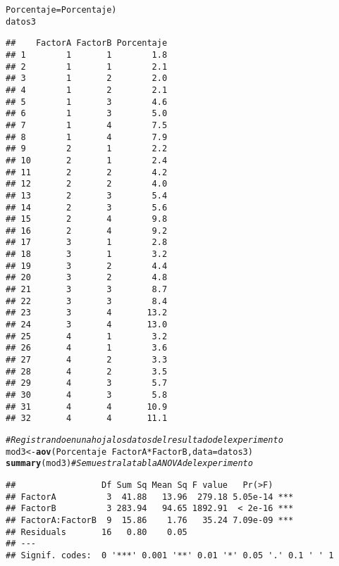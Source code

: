 \documentclass{article}\usepackage[]{graphicx}\usepackage[]{color}
\makeatletter
\newcommand{\hlcom}[1]{\textcolor[rgb]{0.678,0.584,0.686}{\textit{#1}}}%
\newcommand{\hlopt}[1]{\textcolor[rgb]{0,0,0}{#1}}%
\newcommand{\hlstd}[1]{\textcolor[rgb]{0.345,0.345,0.345}{#1}}%
\newcommand{\hlkwb}[1]{\textcolor[rgb]{0.69,0.353,0.396}{#1}}%
\newcommand{\hlkwc}[1]{\textcolor[rgb]{0.333,0.667,0.333}{#1}}%
\newcommand{\hlkwd}[1]{\textcolor[rgb]{0.737,0.353,0.396}{\textbf{#1}}}%
\newenvironment{kframe}{%
 \def\at@end@of@kframe{}%
 \ifinner\ifhmode%
  \def\at@end@of@kframe{\end{minipage}}%
  \begin{minipage}{\columnwidth}%
 \fi\fi%
 \def\FrameCommand##1{\hskip\@totalleftmargin \hskip-\fboxsep
 \colorbox{shadecolor}{##1}\hskip-\fboxsep
     \hskip-\linewidth \hskip-\@totalleftmargin \hskip\columnwidth}%
 \MakeFramed {\advance\hsize-\width
   \@totalleftmargin\z@ \linewidth\hsize
   \@setminipage}}%
 {\par\unskip\endMakeFramed%
 \at@end@of@kframe}
\newenvironment{knitrout}{}{} %
\makeatother
\begin{document}
\begin{knitrout}
\begin{kframe}
\begin{alltt}
                   \hlkwc{Porcentaje}\hlstd{=Porcentaje)}
\hlstd{datos3}
\end{alltt}
\begin{verbatim}
##    FactorA FactorB Porcentaje
## 1        1       1        1.8
## 2        1       1        2.1
## 3        1       2        2.0
## 4        1       2        2.1
## 5        1       3        4.6
## 6        1       3        5.0
## 7        1       4        7.5
## 8        1       4        7.9
## 9        2       1        2.2
## 10       2       1        2.4
## 11       2       2        4.2
## 12       2       2        4.0
## 13       2       3        5.4
## 14       2       3        5.6
## 15       2       4        9.8
## 16       2       4        9.2
## 17       3       1        2.8
## 18       3       1        3.2
## 19       3       2        4.4
## 20       3       2        4.8
## 21       3       3        8.7
## 22       3       3        8.4
## 23       3       4       13.2
## 24       3       4       13.0
## 25       4       1        3.2
## 26       4       1        3.6
## 27       4       2        3.3
## 28       4       2        3.5
## 29       4       3        5.7
## 30       4       3        5.8
## 31       4       4       10.9
## 32       4       4       11.1
\end{verbatim}
\begin{alltt}
\hlcom{#Registrando en una hoja los datos del resultado del experimento}
\hlstd{mod3}\hlkwb{<-}\hlkwd{aov}\hlstd{(Porcentaje}\hlopt{~}\hlstd{FactorA}\hlopt{*}\hlstd{FactorB,}\hlkwc{data} \hlstd{= datos3)}
\hlkwd{summary}\hlstd{(mod3)} \hlcom{# Se muestra la tabla ANOVA del experimento}
\end{alltt}
\begin{verbatim}
##                 Df Sum Sq Mean Sq F value   Pr(>F)    
## FactorA          3  41.88   13.96  279.18 5.05e-14 ***
## FactorB          3 283.94   94.65 1892.91  < 2e-16 ***
## FactorA:FactorB  9  15.86    1.76   35.24 7.09e-09 ***
## Residuals       16   0.80    0.05                     
## ---
## Signif. codes:  0 '***' 0.001 '**' 0.01 '*' 0.05 '.' 0.1 ' ' 1
\end{verbatim}
\end{kframe}
\end{knitrout}
\end{document}

